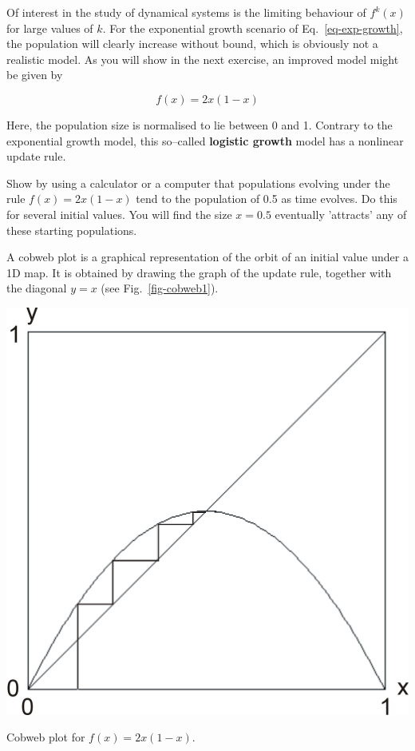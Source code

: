 Of interest in the study of dynamical systems is the limiting behaviour of $f^k(x)$ for large values of $k$. For the exponential growth scenario of Eq.~\ref{eq-exp-growth}, the population will clearly increase without bound, which is obviously not a realistic model. As you will show in the next exercise, an improved model might be given by

\begin{equation}
f(x) = 2 x (1-x) \label{eq-logistic-growth}
\end{equation} 

Here, the population size is normalised to lie between 0 and 1. Contrary to the exponential growth model, this so--called \textbf{logistic growth} model has a nonlinear update rule.

\begin{exer}
Show by using a calculator or a computer that populations evolving under the rule $f(x) = 2 x (1-x)$ tend to the population of 0.5 as time evolves. Do this for several initial values. You will find the size $x=0.5$ eventually 'attracts' any of these starting populations.
\end{exer}

\pagebreak


A cobweb plot is a graphical representation of the orbit of an initial value under a 1D map. It is obtained by drawing the graph of the update rule, together with the diagonal $y=x$ (see Fig.~\ref{fig-cobweb1}).

\begin{marginfigure}
\centering
\includegraphics{dynamic/figures/cobweb1}
\caption{Cobweb plot for $f(x)=2x(1-x)$.}
\label{fig-cobweb1}
\end{marginfigure} 

